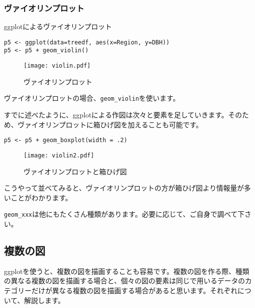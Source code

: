     \subsubsection{ヴァイオリンプロット}
\begin{itembox}[l]{ggplotによるヴァイオリンプロット}
\begin{verbatim}
p5 <- ggplot(data=treedf, aes(x=Region, y=DBH))
p5 <- p5 + geom_violin()
\end{verbatim}
\end{itembox}
\begin{figure}[htb]
\begin{center}
\graphicspath{{1_basic/figs/}}
\texttt{[image: violin.pdf]}\\
\caption{ヴァイオリンプロット}
 \label{violin}
\end{center}
\end{figure}
ヴァイオリンプロットの場合、\verb|geom_violin|を使います。

すでに述べたように、ggplotによる作図は次々と要素を足していきます。そのため、ヴァイオリンプロットに箱ひげ図を加えることも可能です。

\begin{verbatim}
p5 <- p5 + geom_boxplot(width = .2)
\end{verbatim}
\begin{figure}[htb]
\begin{center}
\graphicspath{{1_basic/figs/}}
\texttt{[image: violin2.pdf]}\\
\caption{ヴァイオリンプロットと箱ひげ図}
 \label{violin2}
\end{center}
\end{figure}

こうやって並べてみると、ヴァイオリンプロットの方が箱ひげ図より情報量が多いことがわかります。

\verb|geom_xxx|は他にもたくさん種類があります。必要に応じて、ご自身で調べて下さい。

\clearpage
  \subsection{複数の図}
ggplotを使うと、複数の図を描画することも容易です。複数の図を作る際、種類の異なる複数の図を描画する場合と、個々の図の要素は同じで用いるデータのカテゴリーだけが異なる複数の図を描画する場合があると思います。それぞれについて、解説します。

